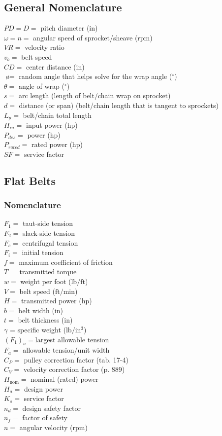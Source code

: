 \documentclass[11pt, fleqn]{article}
\begin{document}
\subsection{General Nomenclature}
$PD=D=$ pitch diameter (in)\\
$\omega=n=$ angular speed of sprocket/sheave (rpm)\\
$VR=$ velocity ratio\\
$v_b=$ belt speed\\
$CD=$ center distance (in)\\
$\text{\o}=$ random angle that helps solve for the wrap angle ($^\circ$)\\
$\theta=$ angle of wrap ($^\circ$)\\
$s=$ arc length (length of belt/chain wrap on sprocket)\\
$d=$ distance (or span) (belt/chain length that is tangent to sprockets)\\
$L_p=$ belt/chain total length\\
$H_{in}=$ input power (hp)\\
$P_{des}=$ power (hp)\\
$P_{rated}=$ rated power (hp)\\
$SF=$ service factor

\subsection{Flat Belts}
\subsubsection{Nomenclature}
    $F_1=$ taut-side tension\\
    $F_2=$ slack-side tension\\
    $F_c=$ centrifugal tension\\
    $F_i=$ initial tension\\
    $f=$ maximum coefficient of friction\\
    $T=$ transmitted torque\\
    $w= $ weight per foot ($\mathrm{lb/ft}$)\\
    $V= $ belt speed ($\mathrm{ft/min}$)\\
    $H=$ transmitted power ($\mathrm{hp}$)\\
    $b=$ belt width ($\mathrm{in}$)\\
    $t=$ belt thickness ($\mathrm{in}$)\\
    $\gamma$ = specific weight ($\mathrm{lb/in^3}$)\\
    $(F_1)_a= $largest allowable tension\\
    $F_a= $ allowable tension/unit width\\
    $C_P=$ pulley correction factor (tab. 17-4)\\
    $C_V=$ velocity correction factor (p. 889)\\
    $H_\text{nom}=$ nominal (rated) power\\
    $H_a=$ design power\\
    $K_s=$ service factor\\
    $n_d= $ design safety factor\\
    $n_f=$ factor of safety\\
    $n=$ angular velocity ($\mathrm{rpm}$)
\end{document}
